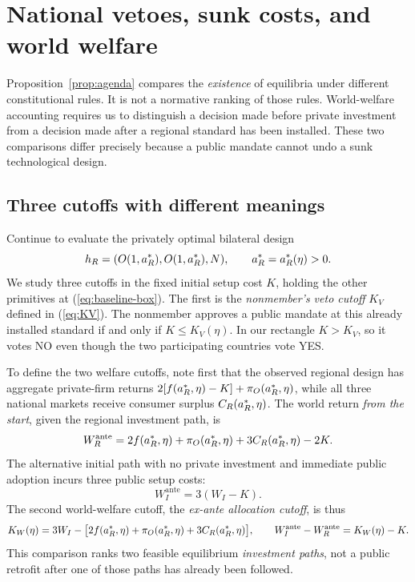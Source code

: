 \section{National vetoes, sunk costs, and world welfare}\label{sec:welfare}

Proposition~\ref{prop:agenda} compares the \emph{existence} of equilibria under different constitutional rules. It is not a normative ranking of those rules. World-welfare accounting requires us to distinguish a decision made before private investment from a decision made after a regional standard has been installed. These two comparisons differ precisely because a public mandate cannot undo a sunk technological design.

\subsection{Three cutoffs with different meanings}\label{subsec:three-cutoffs}

Continue to evaluate the privately optimal bilateral design
\[
 h_R=(O(1,a_R^*),O(1,a_R^*),N),
 \qquad a_R^*=a_R^*(\eta)>0.
\]
We study three cutoffs in the fixed initial setup cost \(K\), holding the other primitives at (\ref{eq:baseline-box}). The first is the \emph{nonmember's veto cutoff} \(K_V\) defined in (\ref{eq:KV}). The nonmember approves a public mandate at this already installed standard if and only if \(K\le K_V(\eta)\). In our rectangle \(K>K_V\), so it votes NO even though the two participating countries vote YES.

To define the two welfare cutoffs, note first that the observed regional design has aggregate private-firm returns
\(2[f(a_R^*,\eta)-K]+\pi_O(a_R^*,\eta)\), while all three national markets receive consumer surplus \(C_R(a_R^*,\eta)\). The world return \emph{from the start}, given the regional investment path, is
\begin{equation}
 W_{R}^{\mathrm{ante}}
 =2f(a_R^*,\eta)+\pi_O(a_R^*,\eta)
 +3C_R(a_R^*,\eta)-2K.
 \label{eq:wr-ante}
\end{equation}
The alternative initial path with no private investment and immediate public adoption incurs three public setup costs:
\begin{equation}
 W_{I}^{\mathrm{ante}}=3(W_I-K).
 \label{eq:wi-ante}
\end{equation}
The second world-welfare cutoff, the \emph{ex-ante allocation cutoff}, is thus
\begin{equation}
 K_W(\eta)=
 3W_I-\bigl[2f(a_R^*,\eta)+\pi_O(a_R^*,\eta)+3C_R(a_R^*,\eta)\bigr],
 \qquad
 W_I^{\mathrm{ante}}-W_R^{\mathrm{ante}}=K_W(\eta)-K.
 \label{eq:kw}
\end{equation}
This comparison ranks two feasible equilibrium \emph{investment paths}, not a public retrofit after one of those paths has already been followed.

